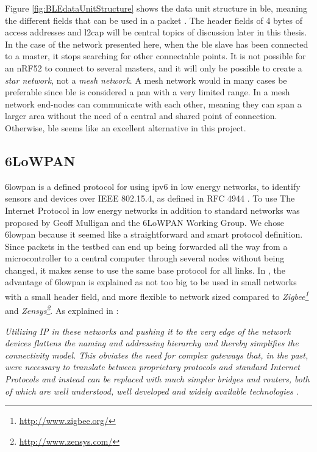\newpage
\noindent Figure \ref{fig:BLEdataUnitStructure} shows the data unit structure in \gls{ble}, meaning the different fields that can be used in a packet \cite{gomez2012overview}. The header fields of 4 \glspl{byte} of access addresses and \gls{l2cap} will be central topics of discussion later in this thesis. In the case of the network presented here, when the \gls{ble} slave has been connected to a master, it stops searching for other connectable points. It is not possible for an \gls{nRF52} to connect to several masters, and it will only be possible to create a \textit{star network}, not a \textit{mesh network}. A mesh network would in many cases be preferable since \gls{ble} is considered a \gls{pan} with a very limited range. In a mesh network end-nodes can communicate with each other, meaning they can span a larger area without the need of a central and shared point of connection. Otherwise, \gls{ble} seems like an excellent alternative in this project. 


\subsection{6LoWPAN}

\noindent \gls{6lowpan} is a defined protocol for using \gls{ipv6} in low energy networks, to identify sensors and devices over  IEEE 802.15.4, as defined in RFC 4944 \cite{montenegro2007transmission}. To use The Internet Protocol in low energy networks in addition to standard networks was proposed by Geoff Mulligan and the 6LoWPAN Working Group\cite{mulligan20076lowpan}. We chose \gls{6lowpan} because it seemed like a straightforward and smart protocol definition. Since packets in the testbed can end up being forwarded all the way from a \gls{microcontroller} to a central computer through several nodes without being changed, it makes sense to use the same base protocol for all links. In \cite{mulligan20076lowpan}, the advantage of \gls{6lowpan} is explained as not too big to be used in small networks with a small header field, and more flexible to network sized compared to \textit{Zigbee\footnote{\url{http://www.zigbee.org/}}} and \textit{Zensys\footnote{\url{http://www.zensys.com/}}}. As explained in \cite{mulligan20076lowpan}:

\noindent\textit{Utilizing IP  in these networks and pushing it to the very edge of the network devices flattens the naming and addressing hierarchy and  thereby  simplifies  the  connectivity  model. This obviates the need  for  complex  gateways  that,  in  the  past,  were  necessary  to translate   between   proprietary   protocols   and   standard   Internet Protocols and instead can be replaced with much simpler bridges and  routers,  both  of  which  are  well  understood, well  developed and  widely  available  technologies \cite{mulligan20076lowpan}.}


